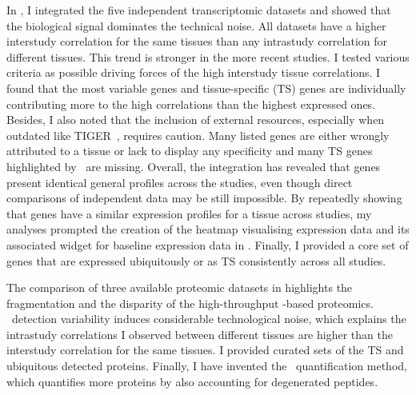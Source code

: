 In ,
I integrated the five independent transcriptomic datasets and
showed that the biological signal dominates the technical noise.
All datasets have a higher interstudy correlation for the same tissues
than any intrastudy correlation for different tissues.
This trend is stronger in the more recent studies.
I tested various criteria as possible driving forces
of the high interstudy tissue correlations.
I found that the most variable genes and tissue-specific (\gls{TS}) genes
are individually contributing more to the high correlations
than the highest expressed ones.
Besides, I also noted that
the inclusion of external resources,
especially when outdated like \gls{TIGER}~,
requires caution.
Many listed genes are either wrongly attributed to a tissue
or lack to display any specificity and
many \gls{TS} genes highlighted by \Rnaseq\ are missing.
Overall, the integration has revealed that
genes present identical general profiles across the studies,
even though direct comparisons of independent data may be still impossible.
By repeatedly showing that
genes have a similar expression profiles for a tissue across studies,
my analyses prompted the creation of the heatmap visualising expression data
and its associated widget for baseline expression data in
.
Finally, I provided a core set of genes that are expressed
ubiquitously or as \gls{TS} consistently across all studies.\mybr\

The comparison of three available proteomic datasets
in  highlights
the fragmentation and the disparity of the high-throughput \ms{}-based proteomics.
\ms\ detection variability induces considerable technological noise,
which explains
the intrastudy correlations I observed between different tissues are
higher than the interstudy correlation for the same tissues.
I provided curated sets of the \gls{TS} and ubiquitous detected proteins.
Finally, I have invented the \PPKM\ quantification method,
which quantifies more proteins by also accounting for degenerated peptides.

